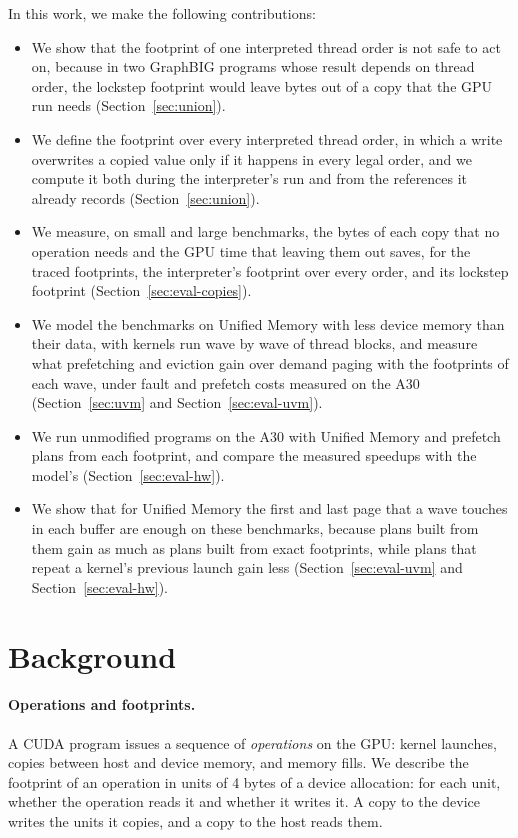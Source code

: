 \documentclass[11pt]{article}
\newcommand{\secref}[1]{Section~\ref{#1}}
\newcommand{\term}[1]{\emph{#1}}
\begin{document}
In this work, we make the following contributions:
\begin{itemize}
\item We show that the footprint of one interpreted thread order is not safe to act on, because in two GraphBIG
programs whose result depends on thread order, the lockstep footprint would leave bytes out of a copy that the GPU
run needs (\secref{sec:union}).
\item We define the footprint over every interpreted thread order, in which a write overwrites a copied value only
if it happens in every legal order, and we compute it both during the interpreter's run and from the references
it already records (\secref{sec:union}).
\item We measure, on \numSmallPrograms{} small and \numLargePrograms{} large benchmarks, the bytes of each copy that
no operation needs and the GPU time that leaving them out saves, for the traced footprints, the interpreter's
footprint over every order, and its lockstep footprint (\secref{sec:eval-copies}).
\item We model the benchmarks on Unified Memory with less device memory than their data, with kernels run wave by
wave of thread blocks, and measure what prefetching and eviction gain over demand paging with the footprints of
each wave, under fault and prefetch costs measured on the A30 (\secref{sec:uvm} and \secref{sec:eval-uvm}).
\item We run \numHwPrograms{} unmodified programs on the A30 with Unified Memory and prefetch plans from each
footprint, and compare the measured speedups with the model's (\secref{sec:eval-hw}).
\item We show that for Unified Memory the first and last page that a wave touches in each buffer are enough on
these benchmarks, because plans built from them gain as much as plans built from exact footprints, while plans
that repeat a kernel's previous launch gain less (\secref{sec:eval-uvm} and \secref{sec:eval-hw}).
\end{itemize}

\section{Background}
\label{sec:background}

\paragraph{Operations and footprints.} A CUDA program issues a sequence of \term{operations} on the GPU: kernel
launches, copies between host and device memory, and memory fills. We describe the footprint of an operation in
units of 4 bytes of a device allocation: for each unit, whether the operation reads it and whether it writes it. A
copy to the device writes the units it copies, and a copy to the host reads them.
\end{document}

